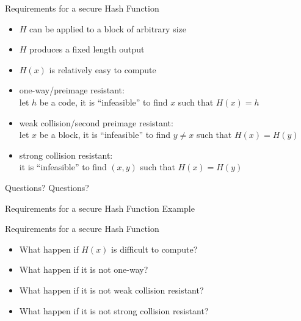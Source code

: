 \documentclass{beamer}
\begin{document}
\begin{frame}{Requirements for a secure Hash Function}
  \begin{itemize}
  \item $H$ can be applied to a block of arbitrary size
  \item $H$ produces a fixed length output
  \item $H(x)$ is relatively easy to compute
  \item one-way/preimage resistant:\\
    let $h$ be a code, it is ``infeasible'' to find $x$
    such that $H(x)=h$
  \item weak collision/second preimage resistant:\\
    let $x$ be a block, it is ``infeasible'' to find $y \neq x$
    such that $H(x)=H(y)$
  \item strong  collision resistant:\\
    it is ``infeasible'' to find $(x,y)$ such that $H(x)=H(y)$
  \end{itemize}
\end{frame}

\begin{frame}{Questions?}
  Questions?
\end{frame}

\begin{frame}{Requirements for a secure Hash Function}
  Example
\end{frame}

\begin{frame}{Requirements for a secure Hash Function}
  \begin{itemize}
  \item<1-> What happen if $H(x)$ is difficult to compute?
  \item<2-> What happen if it is not one-way?
  \item<3-> What happen if it is not weak collision resistant?
  \item<4> What happen if it is not strong  collision resistant?
  \end{itemize}
\end{frame}
\end{document}

